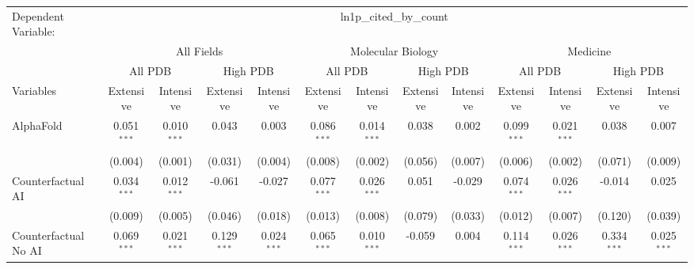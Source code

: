 \begingroup
\centering
\begin{tabular}{lcccccccccccc}
   \tabularnewline \midrule \midrule
   Dependent Variable: & \multicolumn{12}{c}{ln1p\_cited\_by\_count}\\
 & \multicolumn{4}{c}{All Fields} & \multicolumn{4}{c}{Molecular Biology} & \multicolumn{4}{c}{Medicine} \\
\cmidrule(lr){2-5} \cmidrule(lr){6-9} \cmidrule(lr){10-13}
 & \multicolumn{2}{c}{All PDB} & \multicolumn{2}{c}{High PDB} & \multicolumn{2}{c}{All PDB} & \multicolumn{2}{c}{High PDB} & \multicolumn{2}{c}{All PDB} & \multicolumn{2}{c}{High PDB} \\
\cmidrule(lr){2-3} \cmidrule(lr){4-5} \cmidrule(lr){6-7} \cmidrule(lr){8-9} \cmidrule(lr){10-11} \cmidrule(lr){12-13}
Variables & \multicolumn{1}{c}{Extensive} & \multicolumn{1}{c}{Intensive} & \multicolumn{1}{c}{Extensive} & \multicolumn{1}{c}{Intensive} & \multicolumn{1}{c}{Extensive} & \multicolumn{1}{c}{Intensive} & \multicolumn{1}{c}{Extensive} & \multicolumn{1}{c}{Intensive} & \multicolumn{1}{c}{Extensive} & \multicolumn{1}{c}{Intensive} & \multicolumn{1}{c}{Extensive} & \multicolumn{1}{c}{Intensive} \\
\cmidrule(lr){1-1}\cmidrule(lr){2-2} \cmidrule(lr){3-3} \cmidrule(lr){4-4} \cmidrule(lr){5-5} \cmidrule(lr){6-6} \cmidrule(lr){7-7} \cmidrule(lr){8-8} \cmidrule(lr){9-9} \cmidrule(lr){10-10} \cmidrule(lr){11-11} \cmidrule(lr){12-12} \cmidrule(lr){13-13}
   AlphaFold                                & 0.051$^{***}$ & 0.010$^{***}$   & 0.043         & 0.003          & 0.086$^{***}$ & 0.014$^{***}$   & 0.038   & 0.002    & 0.099$^{***}$ & 0.021$^{***}$   & 0.038         & 0.007\\   
                                            & (0.004)       & (0.001)         & (0.031)       & (0.004)        & (0.008)       & (0.002)         & (0.056) & (0.007)  & (0.006)       & (0.002)         & (0.071)       & (0.009)\\   
   Counterfactual AI                        & 0.034$^{***}$ & 0.012$^{***}$   & -0.061        & -0.027         & 0.077$^{***}$ & 0.026$^{***}$   & 0.051   & -0.029   & 0.074$^{***}$ & 0.026$^{***}$   & -0.014        & 0.025\\   
                                            & (0.009)       & (0.005)         & (0.046)       & (0.018)        & (0.013)       & (0.008)         & (0.079) & (0.033)  & (0.012)       & (0.007)         & (0.120)       & (0.039)\\   
   Counterfactual No AI                     & 0.069$^{***}$ & 0.021$^{***}$   & 0.129$^{***}$ & 0.024$^{***}$  & 0.065$^{***}$ & 0.010$^{***}$   & -0.059  & 0.004    & 0.114$^{***}$ & 0.026$^{***}$   & 0.334$^{***}$ & 0.025$^{***}$\\   

\end{tabular}
